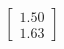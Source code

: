 \documentclass[preview]{standalone}
\begin{document}
\begin{align*}
\begin{bmatrix} 1.50 \\ 1.63 \end{bmatrix}
\end{align*}
\end{document}
